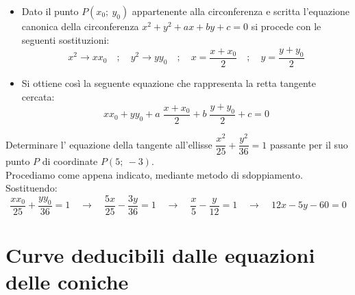 \begin{itemize} [noitemsep]
  \item  Dato il punto \(P( x_{0};~ y_{0} )\) appartenente alla 
circonferenza e scritta l'equazione canonica della circonferenza \( x^{2} + 
y^{2} +ax+by+c=0\) si procede con le seguenti sostituzioni:
\[ x^{2} \longrightarrow x x_{0}  \quad ;\quad y^{2} \longrightarrow y y_{0}\quad ;\quad
x= \dfrac{x+x_{0}}{2} \quad ;\quad y= \dfrac{y+y_{0}}{2}\]

  \item Si ottiene così la seguente equazione che rappresenta la retta 
tangente cercata:
 \[x x_{0} +y y_{0}+a\; \dfrac{x+x_{0}}{2}  +b\; \dfrac{y+y_{0}}{2} +c=0\]
\end{itemize}

\begin{esempio} Determinare l' equazione della tangente 
all'ellisse \( \dfrac{x^{2}}{25}+\dfrac{y^{2}}{36} =1\) passante per il suo 
punto \(P\) di coordinate \(P\left(5;~-3\right)\).\\[7pt] 
Procediamo come appena indicato, mediante metodo di sdoppiamento. Sostituendo:
\[\dfrac{xx_{0}}{25} + \dfrac{yy_{0}}{36} = 1 \quad \rightarrow \quad
\dfrac{5x}{25} - \dfrac{3y}{36} =1 \quad \rightarrow \quad 
\dfrac{x}{5}-\dfrac{y}{12}=1\quad \rightarrow \quad 12x-5y-60=0\]
\end{esempio}

\section{Curve deducibili dalle equazioni delle coniche}
\label{sec:coniche_curve_deducibili}

